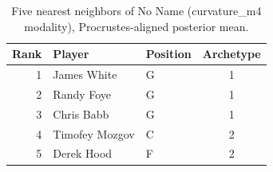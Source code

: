 \begin{table}[htbp]
  \centering\small
  \begin{tabular}{rllc}
    \toprule
    Rank & Player & Position & Archetype \\
    \midrule
    1 & James White & G & 1 \\
    2 & Randy Foye & G & 1 \\
    3 & Chris Babb & G & 1 \\
    4 & Timofey Mozgov & C & 2 \\
    5 & Derek Hood & F & 2 \\
    \bottomrule
  \end{tabular}
  \caption{Five nearest neighbors of No Name (curvature_m4 modality), Procrustes-aligned posterior mean.}
  \label{tab:No_Name_neighbors_curvature_m4}
\end{table}

